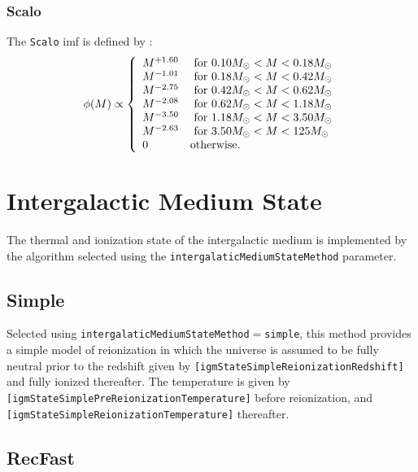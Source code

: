 \subsubsection{Scalo}

The {\tt Scalo} \gls{imf} is defined by \citep{scalo_stellar_1986}:
\begin{equation}
 \phi(M) \propto \left\{ \begin{array}{ll}
 M^{+1.60} & \hbox{ for } 0.10M_\odot < M < 0.18M_\odot \\
 M^{-1.01} & \hbox{ for } 0.18M_\odot < M < 0.42M_\odot \\
 M^{-2.75} & \hbox{ for } 0.42M_\odot < M < 0.62M_\odot \\
 M^{-2.08} & \hbox{ for } 0.62M_\odot < M < 1.18M_\odot \\
 M^{-3.50} & \hbox{ for } 1.18M_\odot < M < 3.50M_\odot \\
 M^{-2.63} & \hbox{ for } 3.50M_\odot < M < 125M_\odot \\
 0 & \hbox {otherwise.} \end{array} \right.
\end{equation}

\section{Intergalactic Medium State}\label{sec:IntergalacticMediumStateMethod}

The thermal and ionization state of the intergalactic medium is implemented by the algorithm selected using the {\tt intergalaticMediumStateMethod} parameter.

\subsection{Simple}\label{phys:intergalacticMediumState:intergalacticMediumStateSimple}

Selected using {\tt intergalaticMediumStateMethod}$=${\tt simple}, this method provides a simple model of reionization in which the universe is assumed to be fully neutral prior to the redshift given by {\tt [igmStateSimpleReionizationRedshift]} and fully ionized thereafter. The temperature is given by {\tt [igmStateSimplePreReionizationTemperature]} before reionization, and {\tt [igmStateSimpleReionizationTemperature]} thereafter.

\subsection{{\sc RecFast}}\label{phys:intergalacticMediumState:intergalacticMediumStateRecFast}

